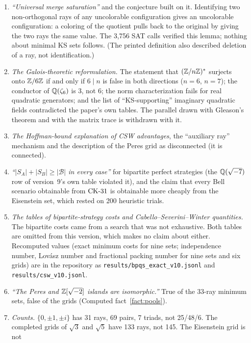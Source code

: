\begin{enumerate}[label=C\arabic*.,leftmargin=2.6em]
complete enumeration.  The accompanying claim that an SMT solver had certified completeness
overstated what was run.
\item \emph{``Universal merge saturation''} and the conjecture built on it.  Identifying two
non-orthogonal rays of any uncolorable configuration gives an uncolorable configuration: a
coloring of the quotient pulls back to the original by giving the two rays the same value.  The
3{,}756 SAT calls verified this lemma; nothing about minimal KS sets follows.  (The printed
definition also described deletion of a ray, not identification.)
\item \emph{The Galois-theoretic reformulation.}  The statement that $(\mathbb{Z}/n\mathbb{Z})^{*}$ surjects onto
$\mathbb{Z}/6\mathbb{Z}$ if and only if $6\mid n$ is false in both directions ($n=6$, $n=7$); the conductor of
$\mathbb{Q}(\zeta_6)$ is 3, not 6; the norm characterization fails for real quadratic generators; and the
list of ``KS-supporting'' imaginary quadratic fields contradicted the paper's own tables.  The
parallel drawn with Gleason's theorem and with the matrix trace is withdrawn with it.
\item \emph{The Hoffman-bound explanation of CSW advantages}, the ``auxiliary ray'' mechanism and
the description of the Peres grid as disconnected (it is connected).
\item \emph{``$|S_A|+|S_B|\ge|\mathcal B|$ in every case''} for bipartite perfect strategies
(the $\mathbb{Q}(\sqrt{-7})$ row of version~9's own table violated it), and the
claim that every Bell scenario obtainable from $\mathrm{CK}\text{-}31$ is obtainable more cheaply from the
Eisenstein set, which rested on 200 heuristic trials.
\item \emph{The tables of bipartite-strategy costs and Cabello--Severini--Winter quantities.}
The bipartite costs came from a search that was not exhaustive.  Both tables are omitted from
this version, which makes no claim about either.  Recomputed values (exact minimum costs for
nine sets; independence number, Lov\'asz number and fractional packing number for nine sets and
six grids) are in the repository as \texttt{results/bpqs\_exact\_v10.jsonl} and
\texttt{results/csw\_v10.jsonl}.
\item \emph{``The Peres and $\mathbb{Z}[\sqrt{-2}]$ islands are isomorphic.''}  True of the 33-ray minimum
sets, false of the grids (Computed fact~\ref{fact:pools}).
\item \emph{Counts.}  $\{0,\pm1,\pm i\}$ has 31 rays, 69 pairs, 7 triads, not 25/48/6.  The
completed grids of $\sqrt3$ and $\sqrt5$ have 133 rays, not 145.  The Eisenstein grid is not

\end{enumerate}
